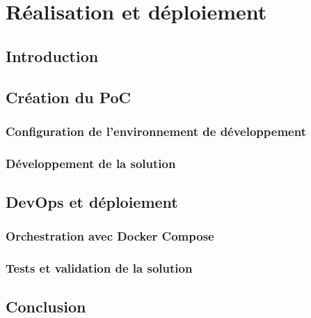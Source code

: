 \chapter{Réalisation et déploiement}

\section*{Introduction}

\section{Création du PoC}


\subsection{Configuration de l'environnement de développement}
\subsection{Développement de la solution}

\section{DevOps et déploiement}


\subsection{Orchestration avec Docker Compose}


\subsection{Tests et validation de la solution}


\section{Conclusion}

